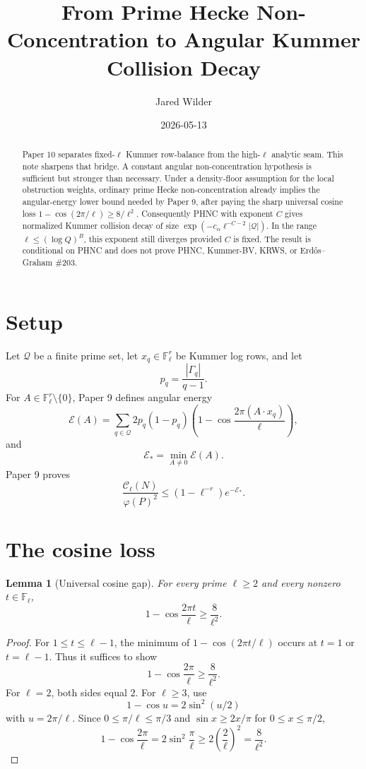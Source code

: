 \documentclass[11pt]{article}
\title{From Prime Hecke Non-Concentration to Angular Kummer Collision Decay}
\author{Jared Wilder}
\date{2026-05-13}
\newtheorem{lemma}{Lemma}
\newcommand{\F}{\mathbb F}
\newcommand{\E}{\mathcal E}
\begin{document}
\maketitle

\begin{abstract}
Paper 10 separates fixed-\(\ell\) Kummer row-balance from the high-\(\ell\) analytic seam.  This note sharpens that bridge.  A constant angular non-concentration hypothesis is sufficient but stronger than necessary.  Under a density-floor assumption for the local obstruction weights, ordinary prime Hecke non-concentration already implies the angular-energy lower bound needed by Paper 9, after paying the sharp universal cosine loss \(1-\cos(2\pi/\ell)\ge8/\ell^2\).  Consequently PHNC with exponent \(C\) gives normalized Kummer collision decay of size \(\exp(-c_\alpha \ell^{-C-2}|\mathcal Q|)\).  In the range \(\ell\le(\log Q)^B\), this exponent still diverges provided \(C\) is fixed.  The result is conditional on PHNC and does not prove PHNC, Kummer-BV, KRWS, or Erd\H{o}s--Graham \#203.
\end{abstract}

\section{Setup}

Let \(\mathcal Q\) be a finite prime set, let \(x_q\in\F_\ell^r\) be Kummer log rows, and let
\[
p_q=\frac{|\Gamma_q|}{q-1}.
\]
For \(A\in\F_\ell^r\setminus\{0\}\), Paper 9 defines angular energy
\[
\E(A)=
\sum_{q\in\mathcal Q}
2p_q(1-p_q)
\left(1-\cos\frac{2\pi(A\cdot x_q)}{\ell}\right),
\]
and
\[
\E_*=\min_{A\ne0}\E(A).
\]
Paper 9 proves
\begin{equation}\label{E:paper9-angular}
\frac{\mathcal C_\ell(N)}{\varphi(P)^2}
\le
(1-\ell^{-r})e^{-\E_*}.
\end{equation}

\section{The cosine loss}

\begin{lemma}[Universal cosine gap]\label{L:cosine-gap}
For every prime \(\ell\ge2\) and every nonzero \(t\in\F_\ell\),
\[
1-\cos\frac{2\pi t}{\ell}
\ge
\frac8{\ell^2}.
\]
\end{lemma}

\begin{proof}
For \(1\le t\le\ell-1\), the minimum of \(1-\cos(2\pi t/\ell)\) occurs at \(t=1\) or \(t=\ell-1\).  Thus it suffices to show
\[
1-\cos\frac{2\pi}{\ell}\ge\frac8{\ell^2}.
\]
For \(\ell=2\), both sides equal \(2\).  For \(\ell\ge3\), use
\[
1-\cos u=2\sin^2(u/2)
\]
with \(u=2\pi/\ell\).  Since \(0\le\pi/\ell\le\pi/3\) and \(\sin x\ge 2x/\pi\) for \(0\le x\le\pi/2\),
\[
1-\cos\frac{2\pi}{\ell}
=2\sin^2\frac{\pi}{\ell}
\ge
2\left(\frac{2}{\ell}\right)^2
=\frac8{\ell^2}.
\]
\end{proof}
\end{document}
